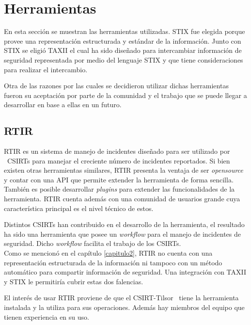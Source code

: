 \section{Herramientas}
	En esta sección se muestran las herramientas utilizadas. STIX fue elegida porque provee una representación estructurada
	y estándar de la información. Junto con STIX se eligió TAXII el cual ha sido diseñado para intercambiar información de
	seguridad representada por medio del lenguaje STIX y que tiene consideraciones para realizar el intercambio.\\
	\bigskip

	Otra de las razones por las cuales se decidieron utilizar dichas herramientas fueron su aceptación por parte de la comunidad y el trabajo que se puede llegar a desarrollar en base a ellas en un futuro.


\bigskip

\subsection{RTIR}

\bigskip

	RTIR es un sistema de manejo de incidentes diseñado para ser utilizado por \ CSIRTs para manejar el creciente número de
	incidentes reportados. Si bien existen otras herramientas similares, RTIR presenta la ventaja de ser
	\textit{opensource} y contar con una API que permite extender la herramienta de forma sencilla. También es posible
	desarrollar \textit{plugins} para extender las funcionalidades de la herramienta. RTIR cuenta además con una comunidad
	de usuarios grande cuya característica principal es el nivel técnico de estos.\\
	\bigskip

	Distintos CSIRTs han contribuido en el desarrollo de la herramienta, el resultado ha sido una herramienta que posee un
	\textit{workflow} para el manejo de incidentes de seguridad. Dicho \textit{workflow} facilita el trabajo de los
	CSIRTs.\\
\bigskip
	Como se mencionó en el capítulo \ref{capitulo2}, RTIR no cuenta con una representación estructurada de la información ni tampoco
	con un método automático para compartir información de seguridad. Una integración con TAXII y STIX le permitiría cubrir
	estas dos falencias.


\bigskip

	El interés de usar RTIR proviene de que el CSIRT-Tilsor \ tiene la herramienta instalada y la utiliza para sus
	operaciones. Además hay miembros del equipo que tienen experiencia en su uso.


